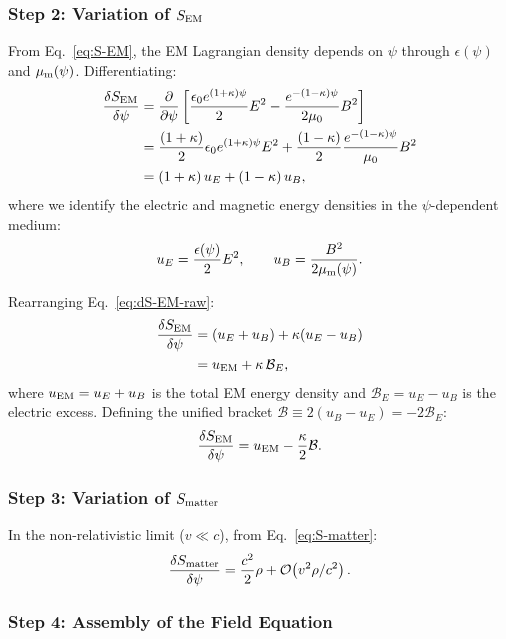 \documentclass[aps,prd,twocolumn,superscriptaddress,floatfix,nofootinbib]{revtex4-2}
\newcommand{\kap}{\kappa}
\newcommand{\calB}{\mathcal{B}}
\renewcommand{\order}[1]{\mathcal{O}\!\left(#1\right)}
\begin{document}
\subsubsection{Step 2: Variation of $S_{\rm EM}$}

From Eq.~\eqref{eq:S-EM}, the EM Lagrangian density depends on $\psi$
through $\epsilon(\psi)$ and $\mu_{\rm m}(\psi)$. Differentiating:
\begin{align}
\frac{\delta S_{\rm EM}}{\delta\psi}
&= \frac{\partial}{\partial\psi}\left[
  \frac{\epsilon_0 e^{(1+\kap)\psi}}{2}E^2
  - \frac{e^{-(1-\kap)\psi}}{2\mu_0}B^2\right] \notag\\
&= \frac{(1+\kap)}{2}\epsilon_0 e^{(1+\kap)\psi}E^2
  + \frac{(1-\kap)}{2}\frac{e^{-(1-\kap)\psi}}{\mu_0}B^2 \notag\\
&= (1+\kap)\,u_E + (1-\kap)\,u_B,
\label{eq:dS-EM-raw}
\end{align}
where we identify the electric and magnetic energy densities in the
$\psi$-dependent medium:
\begin{equation}
u_E = \frac{\epsilon(\psi)}{2}E^2, \qquad
u_B = \frac{B^2}{2\mu_{\rm m}(\psi)}.
\end{equation}

Rearranging Eq.~\eqref{eq:dS-EM-raw}:
\begin{align}
\frac{\delta S_{\rm EM}}{\delta\psi}
&= (u_E + u_B) + \kap(u_E - u_B) \notag\\
&= u_{\rm EM} + \kap\,\calB_E,
\label{eq:dS-EM}
\end{align}
where $u_{\rm EM} = u_E + u_B$ is the total EM energy density and
$\calB_E = u_E - u_B$ is the electric excess. Defining the unified
bracket $\calB \equiv 2(u_B - u_E) = -2\calB_E$:
\begin{equation}
\frac{\delta S_{\rm EM}}{\delta\psi}
= u_{\rm EM} - \frac{\kap}{2}\calB.
\label{eq:dS-EM-bracket}
\end{equation}

\subsubsection{Step 3: Variation of $S_{\rm matter}$}

In the non-relativistic limit ($v \ll c$), from Eq.~\eqref{eq:S-matter}:
\begin{equation}
\frac{\delta S_{\rm matter}}{\delta\psi}
= \frac{c^2}{2}\rho + \order{v^2\rho/c^2}.
\label{eq:dS-matter}
\end{equation}

\subsubsection{Step 4: Assembly of the Field Equation}
\end{document}
